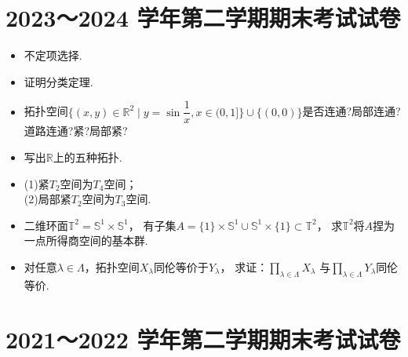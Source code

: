 \section{2023～2024 学年第二学期期末考试试卷}
\begin{itemize}

    \item[一、]
    不定项选择.

    \item[二、]
    证明分类定理.

    \item[三、]
    拓扑空间$\{(x,y)\in \mathbb{R}^2\mid y=\sin \dfrac{1}{x},x\in (0,1]\}\cup\{(0,0)\}$是否连通?局部连通?道路连通?紧?局部紧?

    \item[四、]
    写出$\mathbb{R}$上的五种拓扑.

    \item[五、]
    (1)紧$T_2$空间为$T_4$空间；\\
    (2)局部紧$T_2$空间为$T_3$空间.

    \item[六、]
    二维环面$\mathbb{T}^2=\mathbb{S}^1\times\mathbb{S}^1$，
    有子集$A=\{1\}\times\mathbb{S}^1\cup\mathbb{S}^1\times\{1\}\subset\mathbb{T}^2$，
    求$\mathbb{T}^2$将$A$捏为一点所得商空间的基本群.

    \item[七、]
    对任意$\lambda \in \Lambda$，拓扑空间$X_\lambda$同伦等价于$Y_\lambda$，
    求证：$\prod\limits_{\lambda\in \Lambda}X_\lambda$
    与$\prod\limits_{\lambda \in \Lambda} Y_\lambda$同伦等价.
\end{itemize}

\section{2021～2022 学年第二学期期末考试试卷}

